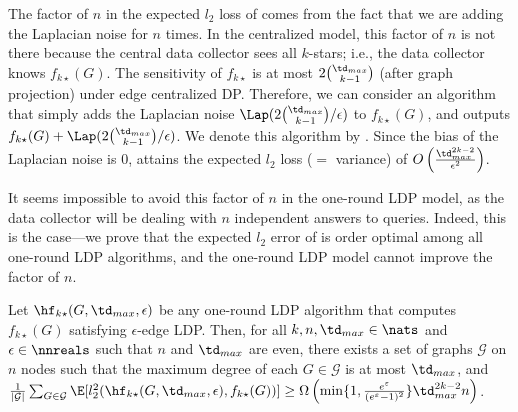 The factor of $n$ in the 
expected $l_2$ loss 
of 
comes from the fact that we are adding 
the Laplacian noise for $n$ times. 
In the centralized model, this factor of $n$ is not there
because the central data collector sees all $k$-stars; i.e., the data collector knows $f_{k\star}(G)$. 
The 
sensitivity of $f_{k\star}$ is 
at most $2\binom{\td_{max}}{k-1}$ (after graph projection) under edge centralized DP. 
Therefore, we can consider an algorithm that simply adds the Laplacian noise $\Lap(2\binom{\td_{max}}{k-1}/\epsilon)$ to $f_{k\star}(G)$, and outputs $f_{k\star}(G) + \Lap(2\binom{\td_{max}}{k-1}/\epsilon)$. 
We denote this algorithm by . 
Since the bias of the Laplacian noise is $0$, 
 attains the expected $l_2$ loss ($=$ variance) of $O\left(\frac{\td_{max}^{2k-2}}{\epsilon^2}\right)$. 

It seems impossible to avoid this factor of $n$ in the 
one-round 
LDP model, as the data collector will be dealing with $n$ independent answers to
queries. Indeed, this is the case---we prove that the expected $l_2$ error of  
is order optimal among all 
one-round 
LDP algorithms, and 
the 
one-round 
LDP model cannot
improve 
the factor of $n$.

\begin{corollary}\label{chap1-cor:kstars-lb}
  Let 
  $\hf_{k\star}(G,\td_{max},\epsilon)$
  be any 
  one-round 
  LDP algorithm that 
  computes $f_{k\star}(G)$ satisfying $\epsilon$-edge LDP. Then, for all
  $k,n,\td_{max} \in \nats$ and $\epsilon \in \nnreals$ such that 
  $n$ and $\td_{max}$ are even, 
  there exists a set of graphs $\mathcal{G}$
  on $n$ 
  nodes 
  such that 
  the maximum degree of each $G \in \mathcal{G}$ is
  at most $\td_{max}$,
  and 
  $\frac{1}{|\mathcal{G}|}\sum_{G \in \mathcal{G}}\E[l_2^2(\hf_{k\star}(G,\td_{max},\epsilon), f_{k\star}(G))] 
  \geq 
  \Omega\left(\min \{1, \frac{e^\varepsilon}{(e^\varepsilon-1)^2}\}\td_{max}^{2k-2}n \right)$.
\end{corollary}

